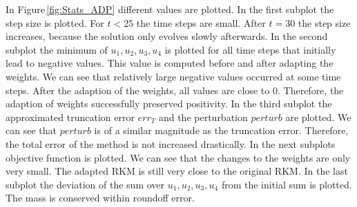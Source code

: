 \documentclass[a4paper]{article}
\numberwithin{equation}{section}
\theoremstyle{plain}
\theoremstyle{definition}
\numberwithin{theorem}{section}
\newcommand{\1}{\mathbbm{1}}
\newcommand{\perturb}{perturb}
\begin{document}
In Figure\,\ref{fig:Stats_ADP} different values are plotted.
In the first subplot the step size is plotted. For $t<25$ the time steps are small. After $t = 30$ the step size increases, because the solution only evolves slowly afterwards.
In the second subplot the minimum of $u_1,u_2,u_3,u_4$ is plotted for all time steps that initially lead to negative values. This value is computed before and after adapting the weights.
We can see that relatively large negative values occurred at some time steps.
After the adaption of the weights, all values are close to $0$. Therefore, the adaption of weights successfully preserved positivity.
In the third subplot the approximated truncation error $err_T$ and the perturbation $\perturb$ are plotted.
We can see that $\perturb$ is of a similar magnitude as the truncation error. Therefore, the total error of the method is not increased drastically.
In the next subplots objective function is plotted.
We can see that the changes to the weights are only very small. The adapted RKM is still very close to the original RKM.
In the last subplot the deviation of the sum over $u_1,u_2,u_3,u_4$ from the initial sum is plotted.
The mass is conserved within roundoff error.
\end{document}
